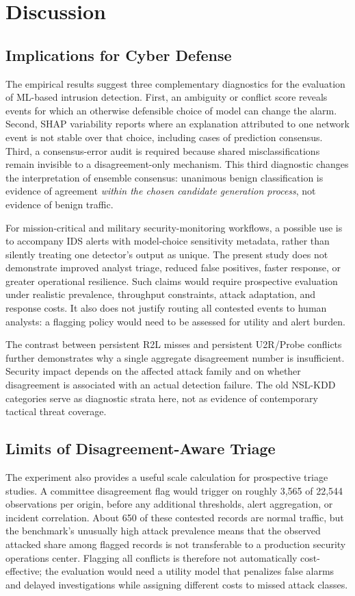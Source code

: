 \documentclass[10pt,conference]{IEEEtran}
\begin{document}
\section{Discussion}
\subsection{Implications for Cyber Defense}
The empirical results suggest three complementary diagnostics for the evaluation of ML-based intrusion detection. First, an ambiguity or conflict score reveals events for which an otherwise defensible choice of model can change the alarm. Second, SHAP variability reports where an explanation attributed to one network event is not stable over that choice, including cases of prediction consensus. Third, a consensus-error audit is required because shared misclassifications remain invisible to a disagreement-only mechanism. This third diagnostic changes the interpretation of ensemble consensus: unanimous benign classification is evidence of agreement \emph{within the chosen candidate generation process}, not evidence of benign traffic.

For mission-critical and military security-monitoring workflows, a possible use is to accompany IDS alerts with model-choice sensitivity metadata, rather than silently treating one detector's output as unique. The present study does not demonstrate improved analyst triage, reduced false positives, faster response, or greater operational resilience. Such claims would require prospective evaluation under realistic prevalence, throughput constraints, attack adaptation, and response costs. It also does not justify routing all contested events to human analysts: a flagging policy would need to be assessed for utility and alert burden.

The contrast between persistent R2L misses and persistent U2R/Probe conflicts further demonstrates why a single aggregate disagreement number is insufficient. Security impact depends on the affected attack family and on whether disagreement is associated with an actual detection failure. The old NSL-KDD categories serve as diagnostic strata here, not as evidence of contemporary tactical threat coverage.

\subsection{Limits of Disagreement-Aware Triage}
The experiment also provides a useful scale calculation for prospective triage studies. A committee disagreement flag would trigger on roughly 3,565 of 22,544 observations per origin, before any additional thresholds, alert aggregation, or incident correlation. About 650 of these contested records are normal traffic, but the benchmark's unusually high attack prevalence means that the observed attacked share among flagged records is not transferable to a production security operations center. Flagging all conflicts is therefore not automatically cost-effective; the evaluation would need a utility model that penalizes false alarms and delayed investigations while assigning different costs to missed attack classes.
\end{document}
